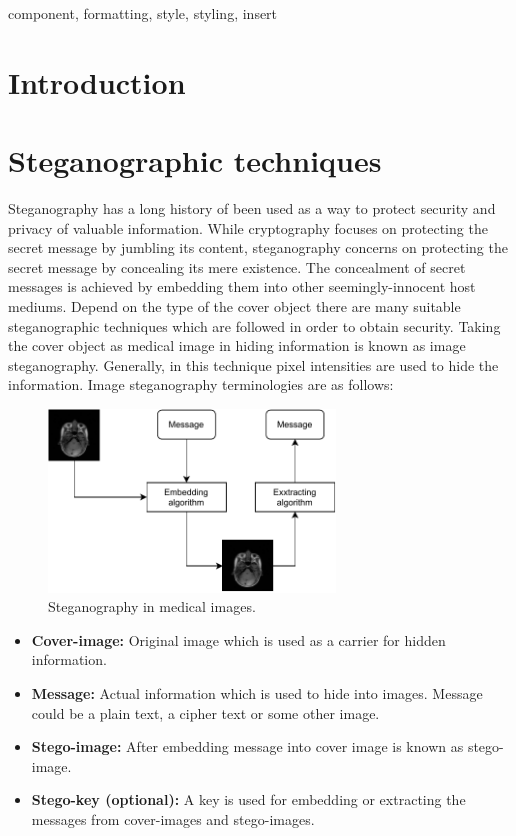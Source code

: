 \documentclass[conference]{IEEEtran}
\begin{document}
\begin{IEEEkeywords}
component, formatting, style, styling, insert
\end{IEEEkeywords}

\section{Introduction}

\section{Steganographic techniques}\label{steTechniques}
Steganography has a long history of been used as a way to protect security and privacy of valuable information. While cryptography focuses on protecting the secret message by jumbling its content, steganography concerns on protecting the secret message by concealing its mere existence. The concealment of secret messages is achieved by embedding them into other seemingly-innocent host mediums. Depend on the type of the cover object there are many suitable steganographic techniques which are followed in order to obtain security. Taking the cover object as medical image in hiding information is known as image steganography. Generally, in this technique pixel intensities are used to hide the information. Image steganography terminologies are as follows:
\begin{figure}[h!]
	\centering
	\includegraphics[width=3in]{steganoImage}
	\caption{Steganography in medical images.}\label{fig:steganoImage}
\end{figure}
\begin{itemize}
	\item \indent \textbf{Cover-image:} Original image which is used as a carrier for hidden information.
	\item \indent \textbf{Message:} Actual information which is used to hide into images. Message could be a plain text, a cipher text or some other image.
	\item \indent \textbf{Stego-image:} After embedding message into cover image is known as stego-image.
	\item \indent \textbf{Stego-key (optional):} A key is used for embedding or extracting the messages from cover-images and stego-images.
\end{itemize}
\end{document}
